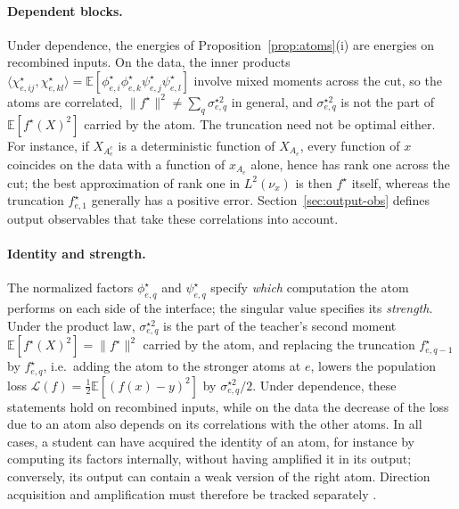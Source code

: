 \documentclass[11pt]{article}
\newcommand{\E}{\mathbb{E}}
\newcommand{\norm}[1]{\lVert #1\rVert}
\theoremstyle{definition}
\numberwithin{equation}{section}
\begin{document}
\paragraph{Dependent blocks.}
Under dependence, the energies of Proposition~\ref{prop:atoms}(i) are energies on recombined inputs. On the data, the inner products $\langle\chi^\star_{e,ij},\chi^\star_{e,kl}\rangle=\E[\phi^\star_{e,i}\phi^\star_{e,k}\psi^\star_{e,j}\psi^\star_{e,l}]$ involve mixed moments across the cut, so the atoms are correlated, $\norm{f^\star}^2\neq\sum_q\sigma^{\star2}_{e,q}$ in general, and $\sigma^{\star2}_{e,q}$ is not the part of $\E[f^\star(X)^2]$ carried by the atom. The truncation need not be optimal either. For instance, if $X_{A_e^c}$ is a deterministic function of $X_{A_e}$, every function of $x$ coincides on the data with a function of $x_{A_e}$ alone, hence has rank one across the cut; the best approximation of rank one in $L^2(\nu_x)$ is then $f^\star$ itself, whereas the truncation $f^\star_{e,1}$ generally has a positive error. Section~\ref{sec:output-obs} defines output observables that take these correlations into account.

\paragraph{Identity and strength.}
The normalized factors $\phi^\star_{e,q}$ and $\psi^\star_{e,q}$ specify \emph{which} computation the atom performs on each side of the interface; the singular value specifies its \emph{strength}. Under the product law, $\sigma^{\star2}_{e,q}$ is the part of the teacher's second moment $\E[f^\star(X)^2]=\norm{f^\star}^2$ carried by the atom, and replacing the truncation $f^\star_{e,q-1}$ by $f^\star_{e,q}$, i.e.\ adding the atom to the stronger atoms at $e$, lowers the population loss $\mathcal L(f)=\frac12\E[(f(x)-y)^2]$ by $\sigma^{\star2}_{e,q}/2$. Under dependence, these statements hold on recombined inputs, while on the data the decrease of the loss due to an atom also depends on its correlations with the other atoms. In all cases, a student can have acquired the identity of an atom, for instance by computing its factors internally, without having amplified it in its output; conversely, its output can contain a weak version of the right atom. Direction acquisition and amplification must therefore be tracked separately \citep[Sections~3.2 and~9.4]{hfl_diagonal}.
\end{document}
